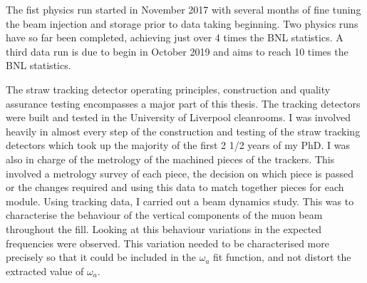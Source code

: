 The fist physics run started in November 2017 with several months of fine tuning the beam injection and storage prior to data taking beginning. Two physics runs have so far been completed, achieving just over 4 times the BNL statistics. A third data run is due to begin in October 2019 and aims to reach 10 times the BNL statistics.

The straw tracking detector operating principles, construction and quality assurance testing encompasses a major part of this thesis. The tracking detectors were built and tested in the University of Liverpool cleanrooms. I was involved heavily in almost every step of the construction and testing of the straw tracking detectors which took up the majority of the first 2 1/2 years of my PhD. I was also in charge of the metrology of the machined pieces of the trackers. This involved a metrology survey of each piece, the decision on which piece is passed or the changes required and using this data to match together pieces for each module. Using tracking data, I carried out a beam dynamics study. This was to characterise the behaviour of the vertical components of the muon beam throughout the fill. Looking at this behaviour variations in the expected frequencies were observed. This variation needed to be characterised more precisely so that it could be included in the $\omega_{a}$ fit function, and not distort the extracted value of $\omega_{a}$.


